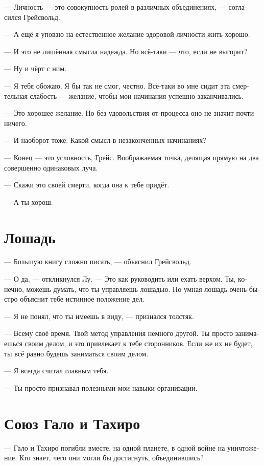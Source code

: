 \documentclass[a4paper,12pt,fleqn]{book}\usepackage{polyglossia}\setdefaultlanguage[babelshorthands=true]{russian}\setotherlanguage{english}\defaultfontfeatures{Ligatures=TeX,Mapping=tex-text}\usepackage{xcolor}\newcommand{\ml}[3]{#2}
\begin{document}
{--- Личность --- это совокупность ролей в различных объединениях, --- согласился Грейсвольд.

--- А ещё я уповаю на естественное желание здоровой личности жить хорошо.

--- И это не лишённая смысла надежда.
\ml{$0$}
{Но всё-таки --- что, если не выгорит?}
{But after all, what if the plan won't come off?''}

\ml{$0$}
{--- Ну и чёрт с ним.}
{``Fuck it then.''}

--- Я тебя обожаю.
Я бы так не смог, честно.
Всё-таки во мне сидит эта смертельная слабость --- желание, чтобы мои начинания успешно заканчивались.

--- Это хорошее желание.
Но без удовольствия от процесса оно не значит почти ничего.

--- И наоборот тоже.
Какой смысл в незаконченных начинаниях?

--- Конец --- это условность, Грейс.
Воображаемая точка, делящая прямую на два совершенно одинаковых луча.

--- Скажи это своей смерти, когда она к тебе придёт.

--- А ты хорош.

\section{Лошадь}

--- Большую книгу сложно писать, --- объяснил Грейсвольд.

--- О да, --- откликнулся Лу.
 --- Это как руководить или ехать верхом.
Ты, конечно, можешь думать, что ты управляешь лошадью.
Но умная лошадь очень быстро объяснит тебе истинное положение дел.

--- Я не понял, что ты имеешь в виду, --- признался толстяк.

--- Всему своё время.
Твой метод управления немного другой.
Ты просто занимаешься своим делом, и это привлекает к тебе сторонников.
Если же их не будет, ты всё равно будешь заниматься своим делом.

--- Я всегда считал главным тебя.

--- Ты просто признавал полезными мои навыки организации.

\section{Союз Гало и Тахиро}

--- Гало и Тахиро погибли вместе, на одной планете, в одной войне на уничтожение.
Кто знает, чего они могли бы достигнуть, объединившись?

}
\end{document}
